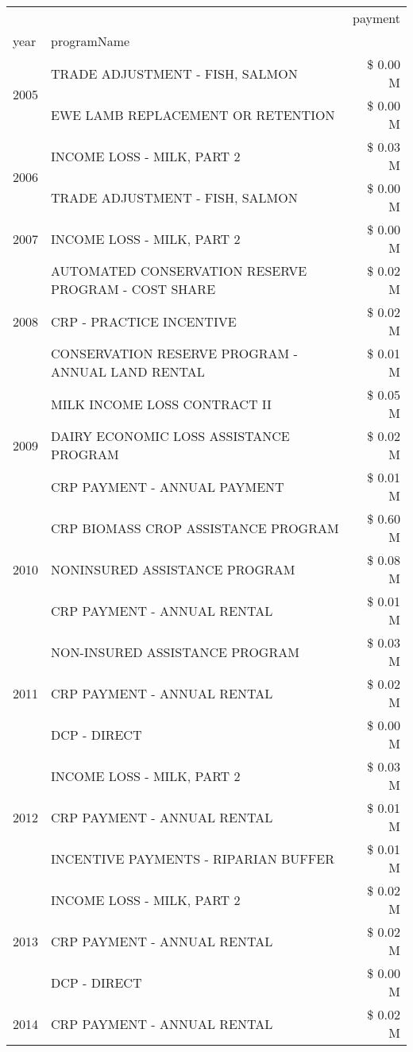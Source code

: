 \begin{tabular}{llr}
\toprule
 &  & payment \\
year & programName &  \\
\midrule
\multirow[t]{2}{*}{2005} & TRADE ADJUSTMENT - FISH, SALMON & \$ 0.00 M \\
 & EWE LAMB REPLACEMENT OR RETENTION & \$ 0.00 M \\
\cline{1-3}
\multirow[t]{2}{*}{2006} & INCOME LOSS - MILK, PART 2 & \$ 0.03 M \\
 & TRADE ADJUSTMENT - FISH, SALMON & \$ 0.00 M \\
\cline{1-3}
2007 & INCOME LOSS - MILK, PART 2 & \$ 0.00 M \\
\cline{1-3}
\multirow[t]{3}{*}{2008} & AUTOMATED CONSERVATION RESERVE PROGRAM - COST SHARE & \$ 0.02 M \\
 & CRP - PRACTICE INCENTIVE & \$ 0.02 M \\
 & CONSERVATION RESERVE PROGRAM - ANNUAL LAND RENTAL & \$ 0.01 M \\
\cline{1-3}
\multirow[t]{3}{*}{2009} & MILK INCOME LOSS CONTRACT II & \$ 0.05 M \\
 & DAIRY ECONOMIC LOSS ASSISTANCE PROGRAM & \$ 0.02 M \\
 & CRP PAYMENT - ANNUAL PAYMENT & \$ 0.01 M \\
\cline{1-3}
\multirow[t]{3}{*}{2010} & CRP BIOMASS CROP ASSISTANCE PROGRAM & \$ 0.60 M \\
 & NONINSURED ASSISTANCE PROGRAM & \$ 0.08 M \\
 & CRP PAYMENT - ANNUAL RENTAL & \$ 0.01 M \\
\cline{1-3}
\multirow[t]{3}{*}{2011} & NON-INSURED ASSISTANCE PROGRAM & \$ 0.03 M \\
 & CRP PAYMENT - ANNUAL RENTAL & \$ 0.02 M \\
 & DCP - DIRECT & \$ 0.00 M \\
\cline{1-3}
\multirow[t]{3}{*}{2012} & INCOME LOSS - MILK, PART 2 & \$ 0.03 M \\
 & CRP PAYMENT - ANNUAL RENTAL & \$ 0.01 M \\
 & INCENTIVE PAYMENTS - RIPARIAN BUFFER & \$ 0.01 M \\
\cline{1-3}
\multirow[t]{3}{*}{2013} & INCOME LOSS - MILK, PART 2 & \$ 0.02 M \\
 & CRP PAYMENT - ANNUAL RENTAL & \$ 0.02 M \\
 & DCP - DIRECT & \$ 0.00 M \\
\cline{1-3}
\multirow[t]{2}{*}{2014} & CRP PAYMENT - ANNUAL RENTAL & \$ 0.02 M \\

\end{tabular}
